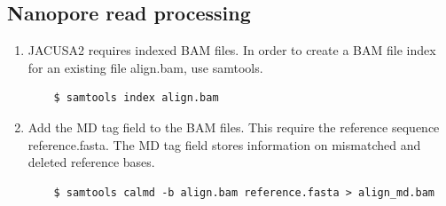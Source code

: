 \documentclass[times, 11pt, a4paper]{article}
\begin{document}
\subsection*{Nanopore read processing}
\begin{enumerate}
	\item  JACUSA2 requires indexed BAM files. In order to create a BAM file index for an existing file align.bam, use samtools.
	\begin{verbatim}
	$ samtools index align.bam
	\end{verbatim}
	\item Add the MD tag field to the BAM files. This require the reference sequence reference.fasta. The MD tag field stores information on mismatched and deleted reference bases.
	\begin{verbatim}
	$ samtools calmd -b align.bam reference.fasta > align_md.bam
	\end{verbatim}
\end{enumerate}	
\end{document}

